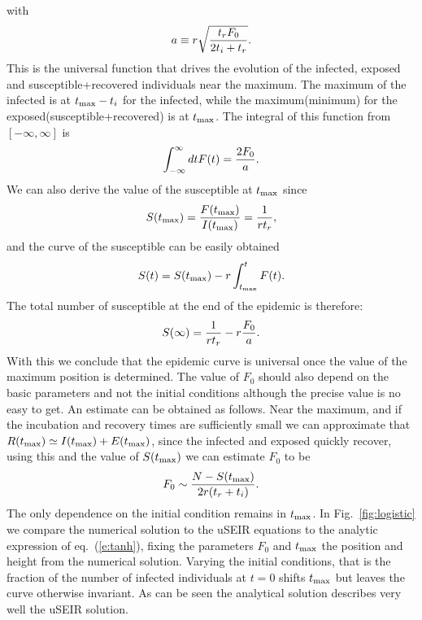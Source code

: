 \documentclass[a4paper,oneside,11pt]{article}
\begin{document}
with 
\begin{eqnarray}
a\equiv r \sqrt{{t_r F_0\over 2 t_i+t_r}}.
\end{eqnarray}
This is the universal function that drives the evolution of the infected, exposed and susceptible+recovered individuals near the maximum. The maximum of the infected is at $t_{\rm max}-t_i$ for the infected, while the maximum(minimum) for the exposed(susceptible+recovered) is at $t_{\rm max}$. The integral of this function from $[-\infty, \infty]$ is
\begin{eqnarray}
\int_{-\infty}^{\infty} dt F(t) = {2 F_0 \over a}.
\end{eqnarray}
We can also derive the value of the susceptible at $t_{\rm max}$ since
\begin{eqnarray}
S(t_{\rm max}) = {F(t_{\rm max}) \over I(t_{\rm max})} = {1  \over r t_r},
\end{eqnarray}
and the curve of the susceptible can be easily obtained 
\begin{eqnarray}
S(t) = S(t_{\rm max}) - r \int_{t_{\rm max}}^t F(t).
\end{eqnarray}
The total number of susceptible at the end of the epidemic is therefore:
\begin{eqnarray}
S(\infty) = {1\over r t_r } - r {F_0\over a}.
\end{eqnarray}
With this we conclude that the epidemic curve is universal once the value of the maximum position is determined. The value of $F_0$ should also 
depend on the basic parameters and not the initial conditions although 
the precise value is no easy to get. An estimate can be obtained as follows. Near the maximum, and if the incubation and recovery times are sufficiently small we can approximate that $R(t_{\rm max}) \simeq I(t_{\rm max}) + E(t_{\rm max})$, since the infected and exposed quickly recover, using this and the value of $S(t_{\rm max})$ we can estimate $F_0$ to be 
\begin{eqnarray}
F_0 \sim {N-S(t_{\rm max})\over 2 r (t_r +  t_i)}.
\end{eqnarray}
The only dependence on the initial condition remains in $t_{\rm max}$.
In Fig.~\ref{fig:logistic} we compare the numerical solution to the uSEIR equations to the analytic expression of eq.~(\ref{e:tanh}), fixing the parameters $F_0$ and $t_{\rm max}$  the position and height from the numerical solution. Varying the initial conditions, that is the fraction of the number of infected individuals at $t=0$ shifts $t_{\rm max}$ but leaves the curve otherwise invariant. As can be seen the analytical solution describes very well the uSEIR solution. 
\end{document}
